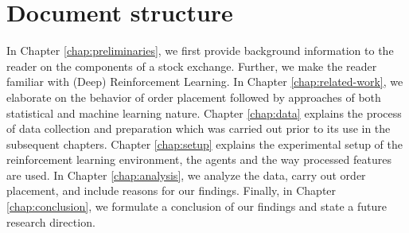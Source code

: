 \section{Document structure}

In Chapter \ref{chap:preliminaries}, we first provide background information to the reader on the components of a stock exchange. %
Further, we make the reader familiar with (Deep) Reinforcement Learning.
In Chapter \ref{chap:related-work}, we elaborate on the behavior of order placement followed by approaches of both statistical and machine learning nature.
Chapter \ref{chap:data} explains the process of data collection and preparation which was carried out prior to its use in the subsequent chapters.
Chapter \ref{chap:setup} explains the experimental setup of the reinforcement learning environment, the agents and the way processed features are used.
In Chapter \ref{chap:analysis}, we analyze the data, carry out order placement, and include reasons for our findings.
Finally, in Chapter \ref{chap:conclusion}, we formulate a conclusion of our findings and state a future research direction.
